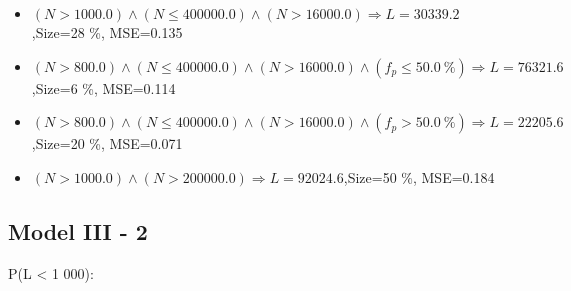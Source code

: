 \documentclass[numbered]{CSL}
\begin{document}
\begin{itemize}
\item $(N > 1000.0) \land (N \leq 400000.0) \land (N > 16000.0) \Rightarrow L = 30339.2$,\hfill Size=28 \%, MSE=0.135
\item $(N > 800.0) \land (N \leq 400000.0) \land (N > 16000.0) \land (f_p \leq 50.0~\%) \Rightarrow L = 76321.6$,\hfill Size=6 \%, MSE=0.114
\item $(N > 800.0) \land (N \leq 400000.0) \land (N > 16000.0) \land (f_p > 50.0~\%) \Rightarrow L = 22205.6$,\hfill Size=20 \%, MSE=0.071
\item $(N > 1000.0) \land (N > 200000.0) \Rightarrow L = 92024.6$,\hfill Size=50 \%, MSE=0.184
\end{itemize}

\subsection{Model III - 2}
P(L < 1 000):
\end{document}

